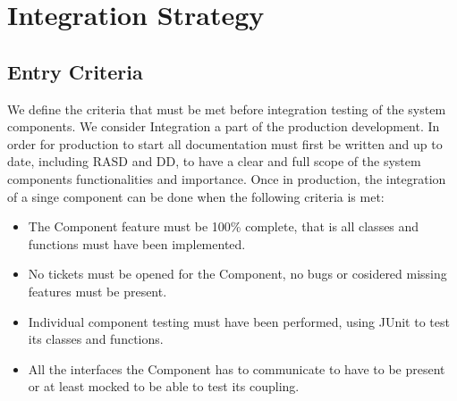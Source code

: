 \documentclass[a4paper]{article}
\begin{document}
\newpage
\section{Integration Strategy}
\subsection{Entry Criteria}
We define the criteria that must be met before integration testing of the system components. We consider Integration a part of the production development. In order for production to start all documentation must first be written and up to date, including RASD and DD, to have a clear and full scope of the system components functionalities and importance. Once in production, the integration of a singe component can be done when the following criteria is met:
\begin{itemize}
\item The Component feature must be 100\% complete, that is all classes and functions must have been implemented.
\item No tickets must be opened for the Component, no bugs or cosidered missing features must be present.
\item Individual component testing must have been performed, using JUnit to test its classes and functions.
\item All the interfaces the Component has to communicate to have to be present or at least mocked to be able to test its coupling.
\end{itemize}
  
\end{document}
